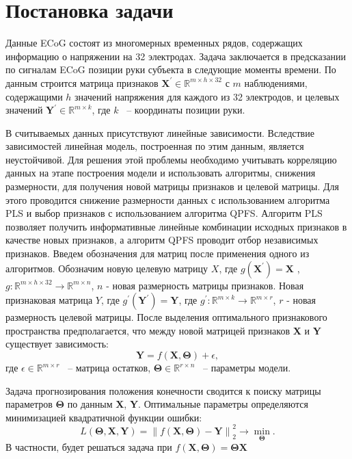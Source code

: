 \documentclass[12pt,twoside]{article}
\newcommand{\norm}[1]{\left\lVert#1\right\rVert}
\begin{document}
\section{Постановка задачи}

Данные ECoG состоят из многомерных временных рядов, содержащих информацию о напряжении на 32 электродах. Задача заключается в предсказании по сигналам ECoG позиции руки субъекта в следующие моменты времени. По данным строится матрица 
признаков $\textbf{X}^\prime \in \mathbb{R}^{m\times h \times 32}$ с $m$ наблюдениями, содержащими $h$ значений напряжения для каждого из 32 электродов, и целевых значений $\textbf{Y}^\prime \in \mathbb{R}^{m\times k}$, где $k$ ~-- координаты позиции руки.

В считываемых данных присутствуют линейные зависимости. Вследствие зависимостей линейная модель, построенная по этим данным, является неустойчивой. Для решения этой проблемы необходимо учитывать корреляцию данных на этапе построения модели и использовать алгоритмы,
снижения размерности, для получения новой матрицы признаков и целевой матрицы.  Для этого проводится снижение размерности данных с использованием алгоритма PLS и выбор признаков с использованием алгоритма QPFS. Алгоритм PLS позволяет получить информативные линейные комбинации исходных признаков в качестве новых признаков, а алгоритм QPFS проводит отбор независимых признаков. Введем обозначения для матриц после применения одного из алгоритмов. Обозначим новую целевую матрицу $X$, где $g(\textbf{X}^\prime) = \textbf{X}$ , $g: \mathbb{R}^{m\times h \times 32} \to \mathbb{R}^{m\times n} $, $n$ - новая размерность матрицы признаков. Новая признаковая матрица $Y$, где $g^\prime(\textbf{Y}^\prime) = \textbf{Y}$, где $g^\prime: \mathbb{R}^{m\times k} \to \mathbb{R}^{m\times r} $, $r$ - новая размерность целевой матрицы. После выделения оптимального признакового пространства предполагается, что между новой матрицей признаков \textbf{X} и \textbf{Y} существует зависимость: $$ \textbf{Y} = f(\boldsymbol{X},\boldsymbol{\Theta}) + \epsilon ,$$ где $\epsilon \in \mathbb{R}^{m\times r}$ ~-- матрица остатков, $ \boldsymbol{\Theta} \in \mathbb{R}^{r\times n}$ ~-- параметры модели. 

Задача прогнозирования положения конечности сводится к поиску матрицы параметров $ \boldsymbol{\Theta}$ по данным \textbf{X}, \textbf{Y}. Оптимальные параметры определяются минимизацией квадратичной функции ошибки:
$$ L( \boldsymbol{\Theta}, \textbf{X}, \textbf{Y}) = \norm{ f(\boldsymbol{X},\boldsymbol{\Theta})  - \textbf{Y}}^2_2 \to \min_{\boldsymbol{\Theta}}. $$ В частности, будет решаться задача при $f(\boldsymbol{X},\boldsymbol{\Theta}) = \boldsymbol{\Theta} \textbf{X}$
\end{document}
